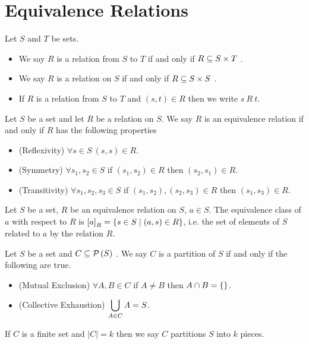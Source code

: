    \section{Equivalence Relations}
        \begin{definition}
            Let $S$ and $T$ be sets. 
            \begin{itemize}
                \item
                    We say $R$ is a relation from $S$ to $T$ if and only if     
                    $R \subseteq S \times T \ $.
                \item
                    We say $R$ is a relation on $S$ if and only if  
                    $R \subseteq S \times S \ $.
                \item
                    If $R$ is a relation from $S$ to $T$ and $(s, t) \in R$ then
                    we write $s \ R \ t$.
            \end{itemize}
        \end{definition}
        \begin{definition}
            Let $S$ be a set and let $R$ be a relation on $S$. We say $R$ is an
            equivalence relation if and only if $R$ has the following properties
            \begin{itemize}
                \item
                    (Reflexivity) $\forall s \in S \ (s, s) \in R$.
                \item
                    (Symmetry) $\forall s_1, s_2 \in S$ if $(s_1, s_2) \in R$ then
                    $(s_2, s_1) \in R$.
                \item
                    (Transitivity) $\forall s_1, s_2, s_3 \in S$ if $(s_1, s_2), (s_2, s_3) \in R$
                    then $(s_1, s_3) \in R$.
            \end{itemize}
        \end{definition}
        \begin{definition}
            Let $S$ be a set, $R$ be an equivalence relation on $S$, $a \in S$.
            The equivalence class of $a$ with respect to $R$ is 
            $\left[a\right]_{R} = \left\{s \in S \mid (a, s) \in R\right\}$, i.e. the set of elements
            of $S$ related to $a$ by the relation $R$.
        \end{definition}
        \begin{definition}
            Let $S$ be a set and $C \subseteq \mathcal{P}\left(S\right) \ $. We say
            $C$ is a partition of $S$ if and only if the following are true.
            \begin{itemize}
                \item
                    (Mutual Exclusion) $\forall A, B \in C$ if $A \neq B$ then $A \cap B = \left\{\right\}$.
                \item
                    (Collective Exhaustion) $\displaystyle\bigcup_{A \in C} A = S$.
            \end{itemize}
            If $C$ is a finite set and $|C| = k$ then we say $C$ partitions
            $S$ into $k$ pieces.
        \end{definition}
